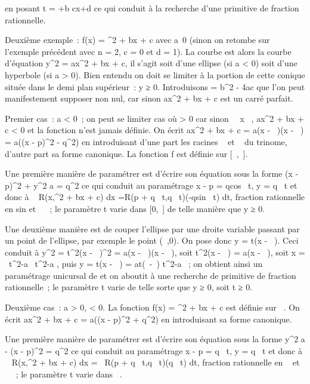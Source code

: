 \documentclass[]{article}
\begin{document}
en posant t = \rootn \ofax+b
\over cx+d  ce qui conduit à la recherche d'une
primitive de fraction rationnelle.

Deuxième exemple~: f(x) = \sqrtax^2  + bx +
c avec a\neq~0 (sinon on retombe sur l'exemple
précédent avec n = 2, c = 0 et d = 1). La courbe \Gamma est alors la courbe
d'équation y^2 = ax^2 + bx + c, il s'agit soit
d'une ellipse (si a < 0) soit d'une hyperbole (si a
> 0). Bien entendu on doit se limiter à la portion de cette
conique située dans le demi plan supérieur~: y ≥ 0. Introduisons \Delta =
b^2 - 4ac que l'on peut manifestement supposer non nul, car
sinon ax^2 + bx + c est un carré parfait.

Premier cas~: a < 0~; on peut se limiter cas où \Delta
> 0 car sinon \forall~~x \in {}~,
ax^2 + bx + c < 0 et la fonction n'est jamais
définie. On écrit ax^2 + bx + c = a(x - \alpha~)(x - \beta~) = a((x -
p)^2 - q^2) en introduisant d'une part les racines \alpha~
et \beta~ du trinome, d'autre part sa forme canonique. La fonction f est
définie sur [\alpha~,\beta~].

Une première manière de paramétrer \Gamma est d'écrire son équation sous la
forme (x - p)^2 + y^2 \over
a = q^2 ce qui conduit au paramétrage x
- p = qcos~ t, y =
q\sqrtasin~
t et donc à \int ~
R(x,\sqrtax^2  + bx + c) dx
=\int  R(p + q\cos~
t,q\sqrtasin~
t)(-qsin~ t) dt, fraction rationnelle en
sin et \cos~ ~; le
paramètre t varie dans [0,\pi~] de telle manière que y ≥ 0.

Une deuxième manière est de couper l'ellipse \Gamma par une droite variable
passant par un point de l'ellipse, par exemple le point (\alpha~,0). On pose
donc y = t(x - \alpha~). Ceci conduit à y^2 = t^2(x -
\alpha~)^2 = a(x - \alpha~)(x - \beta~), soit t^2(x - \alpha~) = a(x - \beta~),
soit x = \alpha~t^2-a\beta~ \over t^2-a ,
puis y = t(x - \alpha~) = at(\beta~-\alpha~) \over t^2-a ~;
on obtient ainsi un paramétrage unicursal de \Gamma et on aboutit à une
recherche de primitive de fraction rationnelle~; le paramètre t varie de
telle sorte que y ≥ 0, soit t ≥ 0.

Deuxième cas~: a > 0, \Delta < 0. La fonction f(x) =
\sqrtax^2  + bx + c est définie sur ~. On
écrit ax^2 + bx + c = a((x - p)^2 +
q^2) en introduisant sa forme canonique.

Une première manière de paramétrer \Gamma est d'écrire son équation sous la
forme  y^2 \over a - (x - p)^2
= q^2 ce qui conduit au paramétrage x - p =
q\mathrmsh~ t, y =
q\sqrta\mathrmch~
t et donc à \int ~
R(x,\sqrtax^2  + bx + c) dx
=\int ~ R(p +
q\mathrmsh~
t,q\sqrta\mathrmch~
t)(q\mathrmch~ t) dt,
fraction rationnelle en
\mathrmsh~ et
\mathrmch~ ~; le paramètre t
varie dans ~.
\end{document}
